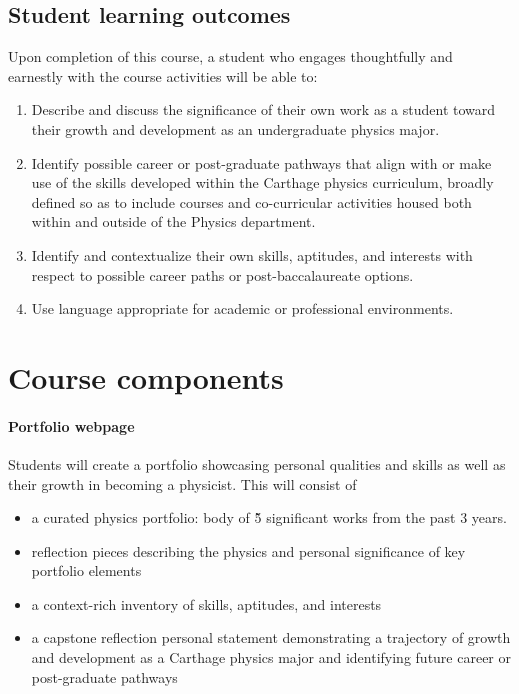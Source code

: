 \documentclass{syllabus}
\begin{document}
\subsection*{Student learning outcomes} 
Upon completion of this course, a student who engages thoughtfully and earnestly with the course activities will be able to:
\begin{enumerate}[label=\textcolor{CarthageDark}{\bfseries\arabic*.}]
    \item Describe and discuss the significance of their own work as a student toward their growth and development as an undergraduate physics major.
    \item Identify possible career or post-graduate pathways that align with or make use of the skills developed within the Carthage physics curriculum, broadly defined so as to include courses and co-curricular activities housed both within and outside of the Physics department.
    \item Identify and contextualize their own skills, aptitudes, and interests with respect to possible career paths or post-baccalaureate options.
    \item Use language appropriate for academic or professional environments.
\end{enumerate}



\section*{Course components}

\paragraph{Portfolio webpage} 
Students will create a portfolio showcasing personal qualities and skills as well as their growth in becoming a physicist. This will consist of 
\begin{itemize}
    \item a curated physics portfolio: body of \~5 significant works from the past 3 years.
    \item reflection pieces describing the physics and personal significance of key portfolio elements
    \item a context-rich inventory of skills, aptitudes, and interests
    \item a capstone reflection personal statement demonstrating a trajectory of growth and development as a Carthage physics major and identifying future career or post-graduate pathways
\end{itemize}
\end{document}
